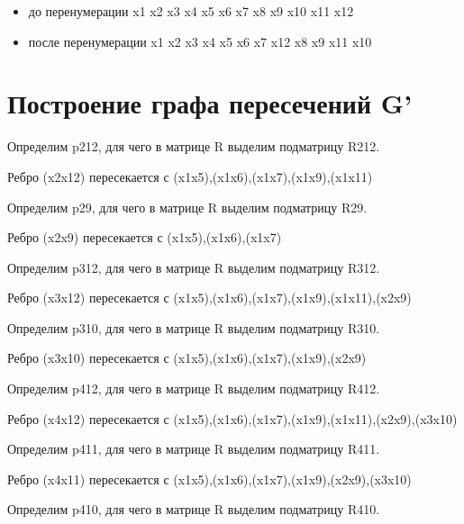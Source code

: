 \documentclass{article}
\begin{document}
\begin{itemize}

  \item до перенумерации	x1	x2	x3	x4	x5	x6	x7	x8	x9	x10	x11	x12

  \item после перенумерации	x1	x2	x3	x4	x5	x6	x7	x12	x8	x9	x11	x10

\end{itemize}



\section{Построение графа пересечений G'}



Определим p212, для чего в матрице R выделим подматрицу R212.



Ребро (x2x12) пересекается с (x1x5),(x1x6),(x1x7),(x1x9),(x1x11)



Определим p29, для чего в матрице R выделим подматрицу R29.



Ребро (x2x9) пересекается с (x1x5),(x1x6),(x1x7)



Определим p312, для чего в матрице R выделим подматрицу R312.



Ребро (x3x12) пересекается с (x1x5),(x1x6),(x1x7),(x1x9),(x1x11),(x2x9)



Определим p310, для чего в матрице R выделим подматрицу R310.



Ребро (x3x10) пересекается с (x1x5),(x1x6),(x1x7),(x1x9),(x2x9)



Определим p412, для чего в матрице R выделим подматрицу R412.



Ребро (x4x12) пересекается с (x1x5),(x1x6),(x1x7),(x1x9),(x1x11),(x2x9),(x3x10)



Определим p411, для чего в матрице R выделим подматрицу R411.



Ребро (x4x11) пересекается с (x1x5),(x1x6),(x1x7),(x1x9),(x2x9),(x3x10)



Определим p410, для чего в матрице R выделим подматрицу R410.
\end{document}
